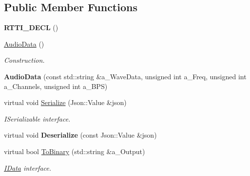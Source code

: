 \subsection*{Public Member Functions}
\begin{DoxyCompactItemize}
\item 
\mbox{\label{class_audio_data_a5575718044a8ddea5b42997c8bcd5d68}} 
{\bfseries R\+T\+T\+I\+\_\+\+D\+E\+CL} ()
\item 
\mbox{\label{class_audio_data_a8bb6ddb671a324453713570496f54e59}} 
\hyperlink{class_audio_data_a8bb6ddb671a324453713570496f54e59}{Audio\+Data} ()
\begin{DoxyCompactList}\small\item\em Construction. \end{DoxyCompactList}\item 
\mbox{\label{class_audio_data_a916c76fcefbffd41a05cddd529df680e}} 
{\bfseries Audio\+Data} (const std\+::string \&a\+\_\+\+Wave\+Data, unsigned int a\+\_\+\+Freq, unsigned int a\+\_\+\+Channels, unsigned int a\+\_\+\+B\+PS)
\item 
\mbox{\label{class_audio_data_ad1e3dd274ef311cb7c92d68f98ff425d}} 
virtual void \hyperlink{class_audio_data_ad1e3dd274ef311cb7c92d68f98ff425d}{Serialize} (Json\+::\+Value \&json)
\begin{DoxyCompactList}\small\item\em I\+Serializable interface. \end{DoxyCompactList}\item 
\mbox{\label{class_audio_data_a58a64796ab07807316c1b8b1f4ea49dc}} 
virtual void {\bfseries Deserialize} (const Json\+::\+Value \&json)
\item 
\mbox{\label{class_audio_data_a1cc9349b5edf80a5e0b35e6eb5cb3045}} 
virtual bool \hyperlink{class_audio_data_a1cc9349b5edf80a5e0b35e6eb5cb3045}{To\+Binary} (std\+::string \&a\+\_\+\+Output)
\begin{DoxyCompactList}\small\item\em \hyperlink{class_i_data}{I\+Data} interface. \end{DoxyCompactList}\item 
\mbox{\label{class_audio_data_a9f543a8cd2349e177c861de05ddb9fa8}} 

\end{DoxyCompactItemize}
